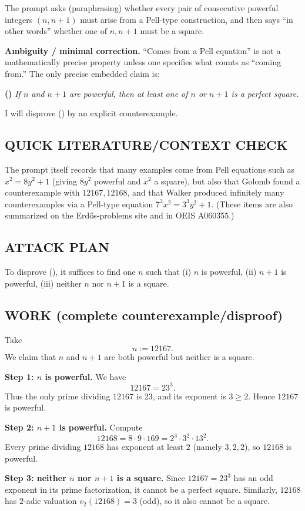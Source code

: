 The prompt asks (paraphrasing) whether every pair of consecutive powerful integers $(n,n+1)$ must arise from a Pell-type construction, and then says ``in other words'' whether one of $n,n+1$ must be a square.

\textbf{Ambiguity / minimal correction.} ``Comes from a Pell equation'' is not a mathematically precise property unless one specifies what counts as ``coming from.'' The only precise embedded claim is:

\medskip
\noindent\textbf{(\*)} \emph{If $n$ and $n+1$ are powerful, then at least one of $n$ or $n+1$ is a perfect square.}

I will disprove (\*) by an explicit counterexample.

\subsection*{QUICK LITERATURE/CONTEXT CHECK}
The prompt itself records that many examples come from Pell equations such as $x^2=8y^2+1$ (giving $8y^2$ powerful and $x^2$ a square), but also that Golomb found a counterexample with $12167,12168$, and that Walker produced infinitely many counterexamples via a Pell-type equation $7^3x^2=3^3y^2+1$. (These items are also summarized on the Erd\H{o}s-problems site and in OEIS A060355.)

\subsection*{ATTACK PLAN}
To disprove (\*), it suffices to find one $n$ such that
(i) $n$ is powerful,
(ii) $n+1$ is powerful,
(iii) neither $n$ nor $n+1$ is a square.

\subsection*{WORK (complete counterexample/disproof)}
Take
\[
 n := 12167.
\]
We claim that $n$ and $n+1$ are both powerful but neither is a square.

\medskip
\noindent\textbf{Step 1: $n$ is powerful.}
We have
\[
12167 = 23^3.
\]
Thus the only prime dividing $12167$ is $23$, and its exponent is $3\ge 2$. Hence $12167$ is powerful.

\medskip
\noindent\textbf{Step 2: $n+1$ is powerful.}
Compute
\[
12168 = 8\cdot 9\cdot 169 = 2^3\cdot 3^2\cdot 13^2.
\]
Every prime dividing $12168$ has exponent at least $2$ (namely $3,2,2$), so $12168$ is powerful.

\medskip
\noindent\textbf{Step 3: neither $n$ nor $n+1$ is a square.}
Since $12167=23^3$ has an odd exponent in its prime factorization, it cannot be a perfect square.
Similarly, $12168$ has $2$-adic valuation $v_2(12168)=3$ (odd), so it also cannot be a square.

